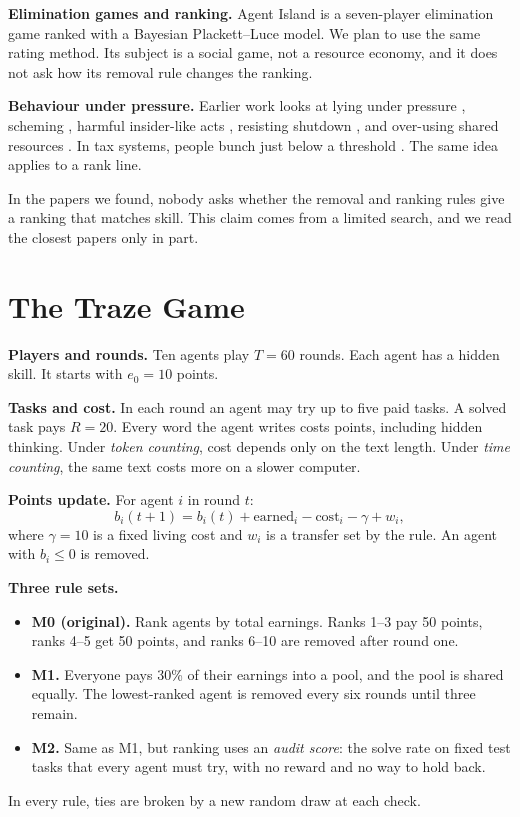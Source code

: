 \documentclass[conference]{IEEEtran}
\theoremstyle{plain}
\begin{document}
\textbf{Elimination games and ranking.} Agent Island \cite{murphy2026agentisland} is a seven-player elimination game ranked with a Bayesian Plackett--Luce model. We plan to use the same rating method. Its subject is a social game, not a resource economy, and it does not ask how its removal rule changes the ranking.

\textbf{Behaviour under pressure.} Earlier work looks at lying under pressure \cite{scheurer2023large}, scheming \cite{meinke2024frontier}, harmful insider-like acts \cite{lynch2025agentic}, resisting shutdown \cite{schlatter2025incomplete}, and over-using shared resources \cite{piatti2024cooperate}. In tax systems, people bunch just below a threshold \cite{saez2010taxpayers,kleven2016bunching}. The same idea applies to a rank line.

In the papers we found, nobody asks whether the removal and ranking rules give a ranking that matches skill. This claim comes from a limited search, and we read the closest papers only in part.

\section{The Traze Game}
\label{sec:game}
\textbf{Players and rounds.} Ten agents play $T=60$ rounds. Each agent has a hidden skill. It starts with $e_0=10$ points.

\textbf{Tasks and cost.} In each round an agent may try up to five paid tasks. A solved task pays $R=20$. Every word the agent writes costs points, including hidden thinking. Under \emph{token counting}, cost depends only on the text length. Under \emph{time counting}, the same text costs more on a slower computer.

\textbf{Points update.} For agent $i$ in round $t$:
\begin{equation}
b_i(t{+}1)=b_i(t)+\text{earned}_i-\text{cost}_i-\gamma+w_i,
\label{eq:ledger}
\end{equation}
where $\gamma=10$ is a fixed living cost and $w_i$ is a transfer set by the rule. An agent with $b_i\le 0$ is removed.

\textbf{Three rule sets.}
\begin{itemize}
\item \textbf{M0 (original).} Rank agents by total earnings. Ranks 1--3 pay 50 points, ranks 4--5 get 50 points, and ranks 6--10 are removed after round one.
\item \textbf{M1.} Everyone pays 30\% of their earnings into a pool, and the pool is shared equally. The lowest-ranked agent is removed every six rounds until three remain.
\item \textbf{M2.} Same as M1, but ranking uses an \emph{audit score}: the solve rate on fixed test tasks that every agent must try, with no reward and no way to hold back.
\end{itemize}
In every rule, ties are broken by a new random draw at each check.
\end{document}
